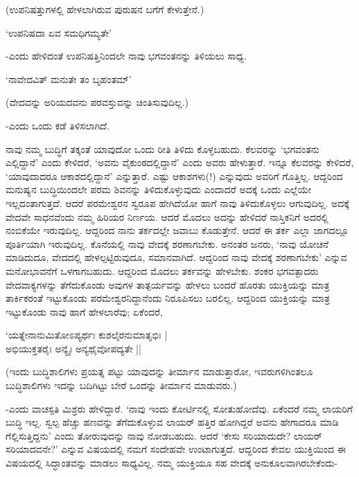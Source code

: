 (ಉಪನಿಷತ್ತುಗಳಲ್ಲಿ ಹೇಳಲಾಗಿರುವ ಪುರುಷನ ಬಗೆಗೆ ಕೇಳುತ್ತೇನೆ.)

\begin{shloka}
`ಉಪನಿಷದಾ ಏವ ಸಮಧಿಗಮ್ಯತೇ'
\end{shloka}

-ಎಂದು ಹೇಳಿದಂತೆ ಉಪನಿಷತ್ತಿನಿಂದಲೇ ನಾವು ಭಗವಂತನನ್ನು ತಿಳಿಯಲು ಸಾಧ್ಯ.

\begin{shloka}
`ನಾವೇದವಿತ್ ಮನುತೇ ತಂ ಬೃಹಂತಮ್'
\end{shloka}

(ವೇದವನ್ನು ಅರಿಯದವನು ಪರವಸ್ತುವನ್ನು ಚಿಂತಿಸುವುದಿಲ್ಲ.)

-ಎಂದು ಒಂದು ಕಡೆ ತಿಳಿಸಲಾಗಿದೆ.

ನಾವು ನಮ್ಮ ಬುದ್ಧಿಗೆ ತಕ್ಕಂತೆ ಯಾವುದೋ ಒಂದು ರೀತಿ ತಿಳಿದು ಕೊಳ್ಳಬಹುದು. ಕೆಲವರನ್ನು `ಭಗವಂತನು ಎಲ್ಲಿದ್ದಾನೆ' ಎಂದು ಕೇಳಿದರೆ, `ಅವನು ವೈಕುಂಠದಲ್ಲಿದ್ದಾನೆ' ಎಂದು ಅವರು ಹೇಳುತ್ತಾರೆ. ಇನ್ನೂ ಕೆಲವರನ್ನು ಕೇಳಿದರೆ, `ಯಾವುದಾದರೂ ಆಕಾಶದಲ್ಲಿದ್ದಾನೆ' ಎನ್ನುತ್ತಾರೆ. ಎಷ್ಟು ಆಕಾಶಗಳು(!) ಎನ್ನುವುದು ಅವರಿಗೆ ಗೊತ್ತಿಲ್ಲ. ಆದ್ದರಿಂದ ಮನುಷ್ಯನ ಬುದ್ಧಿಯಿಂದಲೇ ಪರಮ ಶಿವನನ್ನು ತಿಳಿದುಕೊಳ್ಳುವುದು ಎಂದಾದರೆ ಅದಕ್ಕೆ ಒಂದು ಎಲ್ಲೆಯೇ ಇಲ್ಲದಂತಾಗುತ್ತದೆ. ಆದರೆ ಪರಮೇಶ್ವರನ ಸ್ವರೂಪ ಹೇಗಿದೆಯೋ ಹಾಗೆ ನಾವು ತಿಳಿದುಕೊಳ್ಳಲು ಆಗುವುದಿಲ್ಲ. ಅದಕ್ಕೆ ವೇದವೇ ಸಾಧನವೆಂದು ನಮ್ಮ ಹಿರಿಯರ ನಿರ್ಣಯ. ಆದರೆ ಮೊದಲು ಅದನ್ನು ಹೇಳಿದರೆ ನಾಸ್ತಿಕನಿಗೆ ಅದರಲ್ಲಿ ನಂಬಿಕೆಯೇ ಇರುವುದಿಲ್ಲ. ಆದ್ದರಿಂದ ನಾನು ತರ್ಕದಲ್ಲೇ ಜವಾಬು ಕೊಡುತ್ತೇನೆ. ಆದರೆ ಈ ತರ್ಕ ಎಲ್ಲಾ ಜಾಗದಲ್ಲೂ ಪೂರ್ತಿಯಾಗಿ ಇರುವುದಿಲ್ಲ. ಕೊನೆಯಲ್ಲಿ ನಾವು ವೇದಕ್ಕೆ ಶರಣಾಗಬೇಕು. ಅನಂತರ ಜನರು, `ನಾವು ಯೋಚನೆ ಮಾಡಿದುದೂ, ವೇದದಲ್ಲಿ ಹೇಳಲ್ಪಟ್ಟಿರುವುದೂ, ಸಮಾನವಾಗಿದೆ. ಆದ್ದರಿಂದ ನಾವು ವೇದಕ್ಕೆ ಶರಣಾಗಬೇಕು' ಎನ್ನುವ ಮನೋಭಾವನೆಗೆ ಒಳಗಾಗಬಹುದು. ಆದ್ದರಿಂದ ಮೊದಲು ತರ್ಕವನ್ನು ಹೇಳಬೇಕು. ಶಂಕರ ಭಗವತ್ಪಾದರು ವೇದವಾಕ್ಯಗಳನ್ನು ತೆಗೆದುಕೊಂಡು ಅವುಗಳ ತಾತ್ಪರ್ಯವನ್ನು ಹೇಳಲು ಬಂದರೆ ಹೊರತು ಯುಕ್ತಿಯನ್ನು ಮಾತ್ರ ತಾರ್ಕಿಕರಂತೆ ಇಟ್ಟುಕೊಂಡು ಪರಮೇಶ್ವರನಿದ್ದಾನೆಂದು ನಿರೂಪಿಸಲು ಬರಲಿಲ್ಲ. ಆದ್ದರಿಂದ ಯುಕ್ತಿಯನ್ನು ಮಾತ್ರ ಇಟ್ಟುಕೊಂಡು ನಾವು ಹಾಗೆ ಹೇಳಲಾರೆವು; ಏಕೆಂದರೆ, 

\begin{shloka}
`ಯತ್ನೇನಾನುಮಿತೋಽಪ್ಯರ್ಥಃ ಕುಶಲೈರನುಮಾತೃಭಿಃ |\\
ಅಭಿಯುಕ್ತತರೈಃ ಅನ್ಯೈಃ ಅನ್ಯಥೈವೋಪದ್ಯತೇ ||
\end{shloka}

(ಇಂದು ಬುದ್ಧಿಶಾಲಿಗಳು ಪ್ರಯತ್ನ ಪಟ್ಟು ಯಾವುದನ್ನು ತೀರ್ಮಾನ ಮಾಡುತ್ತಾರೋ, ಇವರುಗಳಿಗಿಂತಲೂ ಬುದ್ಧಿಶಾಲಿಗಳು ಇದನ್ನು ಬದಿಗಿಟ್ಟು ಬೇರೆ ಒಂದನ್ನು ತೀರ್ಮಾನ ಮಾಡುವರು.)

-ಎಂದು ವಾಚಸ್ಪತಿ ಮಿಶ್ರರು ಹೇಳಿದ್ದಾರೆ. `ನಾವು ಇಂದು ಕೋರ್ಟಿನಲ್ಲಿ ಸೋತುಹೋದೆವು. ಏಕೆಂದರೆ ನಮ್ಮ ಲಾಯರಿಗೆ ಬುದ್ಧಿ ಇಲ್ಲ. ಸ್ವಲ್ಪ ಹೆಚ್ಚು ಹಣವನ್ನು ತೆಗೆದುಕೊಳ್ಳುವ ಲಾಯರ್ ಹತ್ತಿರ ಹೋಗಿದ್ದರೆ ಅವನು ಹೇಗಾದರೂ ಮಾಡಿ ಗೆಲ್ಲಿಸುತ್ತಿದ್ದನು' ಎಂದು ತೋರುವುದನ್ನು ನಾವು ನೋಡಬಹುದು. ಆದರೆ `ಕೇಸು ಸರಿಯಾದುದೇ? ಲಾಯರ್ ಸರಿಯಾದವನೇ?' ಎನ್ನುವ ವಿಷಯದಲ್ಲಿ ನಮಗೆ ಸಂದೇಹವೇ ಉಂಟಾಗುತ್ತದೆ. ಆದ್ದರಿಂದ ಕೇವಲ ಯುಕ್ತಿಯಿಂದ ಈ ವಿಷಯದಲ್ಲಿ ಸಿದ್ಧಾಂತವನ್ನು ಮಾಡಲು ಸಾಧ್ಯವಿಲ್ಲ. ನಮ್ಮ ಯುಕ್ತಿಯೂ ಸಹ ವೇದಕ್ಕೆ ಅನುಕೂಲವಾಗಿರಬೇಕೆಂದು-

